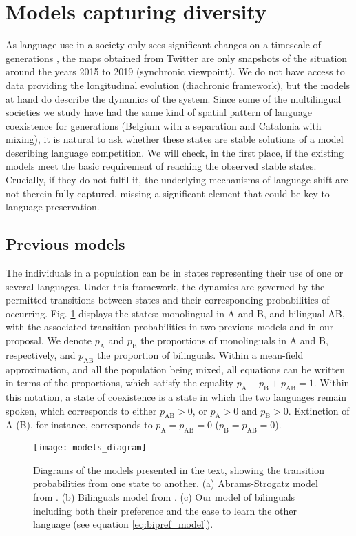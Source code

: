 \documentclass[../thesis.tex]{subfiles}
\begin{document}
\section{Models capturing diversity} 
As language use in a society only sees significant changes on a timescale of
generations \cite{LabovSociolinguisticPatterns1973}, the maps obtained from Twitter are
only snapshots of the situation around the years 2015 to 2019 (synchronic viewpoint). We
do not have access to data providing the longitudinal evolution (diachronic framework),
but the models at hand do describe the dynamics of the system. Since some of the
multilingual societies we study have had the same kind of spatial pattern of language
coexistence for generations (Belgium with a separation and Catalonia with mixing), it is
natural to ask whether these states are stable solutions of a model describing language
competition. We will check, in the first place, if the existing models meet the basic
requirement of reaching the observed stable states. Crucially, if they do not fulfil
it, the underlying mechanisms of language shift are not therein fully captured, missing
a significant element that could be key to language preservation.


\subsection{Previous models}
The individuals in a population can be in states representing their use of one or
several languages. Under this framework, the dynamics are governed by the permitted
transitions between states and their corresponding probabilities of occurring. Fig.
\ref{fig:models_diagram} displays the states: monolingual in A and B, and bilingual AB,
with the associated transition probabilities in two previous models and in our proposal.
We denote $p_{\text{A}}$ and $p_{\text{B}}$ the proportions of monolinguals in A and B,
respectively, and $p_{\text{AB}}$ the proportion of bilinguals. Within a mean-field
approximation, and all the population being mixed, all equations can be written in terms
of the proportions, which satisfy the equality $p_{\text{A}} + p_{\text{B}} +
p_{\text{AB}} = 1$. Within this notation, a state of coexistence is a state in which the
two languages remain spoken, which corresponds to either $p_{\text{AB}} > 0$, or
$p_{\text{A}} > 0$ and $p_{\text{B}} > 0$. Extinction of A (B), for instance,
corresponds to $p_{\text{A}} = p_{\text{AB}} = 0$ ($p_{\text{B}} = p_{\text{AB}} = 0$).
\begin{figure}
\centering
    \texttt{[image: models\_diagram]}
    \caption{Diagrams of the models presented in the text, showing the transition
    probabilities from one state to another. (a) Abrams-Strogatz model from
    \cite{AbramsModellingDynamics2003}. (b) Bilinguals model from
    \cite{CastelloOrderingDynamics2006}. (c) Our model of bilinguals including
    both their preference and the ease to learn the other language (see equation
    \eqref{eq:bipref_model}).}
    \label{fig:models_diagram}
\end{figure}
\end{document}
